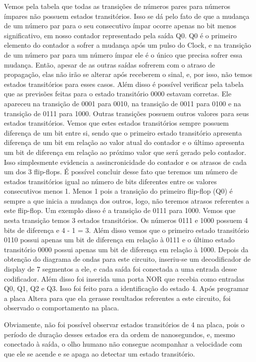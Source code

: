 \documentclass[12pt]{article}
\begin{document}
	
	
	Vemos pela tabela que todas as transições de números pares para números ímpares não possuem estados transitórios. Isso se dá pelo fato de que a mudança de um número par para o seu consecutivo ímpar ocorre apenas no bit menos significativo, em nosso contador representado pela saída Q0. Q0 é o primeiro elemento do contador a sofrer a mudança após um pulso do Clock, e na transição de um número par para um número ímpar ele é o único que precisa sofrer essa mudança. Então, apesar de as outras saídas sofrerem com o atraso de propagação, elas não irão se alterar após receberem o sinal, e, por isso, não temos estados transitórios para esses casos. 
	Além disso é possível verificar pela tabela que as previsões feitas para o estado transitório 0000 estavam corretas. Ele apareceu na transição de 0001 para 0010, na transição de 0011 para 0100 e na transição de 0111 para 1000. 
	Outras transições possuem outros valores para seus estados transitórios. Vemos que estes estados transitórios sempre possuem diferença de um bit entre si, sendo que o primeiro estado transitório apresenta diferença de um bit em relação ao valor atual do contador e o último apresenta um bit de diferença em relação ao próximo valor que será gerado pelo contador. Isso simplesmente evidencia a assincronicidade do contador e os atrasos de cada um dos 3 flip-flops. É possível concluir desse fato que teremos um número de estados transitórios igual ao número de bits diferentes entre os valores consecutivos menos 1. Menos 1 pois a transição do primeiro flip-flop (Q0) é sempre a que inicia a mudança dos outros, logo, não teremos atrasos referentes a este flip-flop. Um exemplo disso é a transição de 0111 para 1000. Vemos que nesta transição temos 3 estados transitórios. Os números 0111 e 1000 possuem 4 bits de diferença e 4 - 1 = 3. Além disso vemos que o primeiro estado transitório 0110 possui apenas um bit de diferença em relação à 0111 e o último estado transitório 0000 possui apenas um bit de diferença em relação à 1000.
	Depois da obtenção do diagrama de ondas para este circuito, inseriu-se um decodificador de display de 7 segmentos a ele, e cada saída foi conectada a uma entrada desse codificador. Além disso foi inserida uma porta NOR que recebia como entradas Q0, Q1, Q2 e Q3. Isso foi feito para a identificação do estado 4.
	Após programar a placa Altera para que ela gerasse resultados referentes a este circuito, foi observado o comportamento na placa. 
	
	
	
	Obviamente, não foi possível observar estados transitórios de 4 na placa, pois o período de duração desses estados era da ordem de nanosegundos, e, mesmo conectado à saída, o olho humano não consegue acompanhar a velocidade com que ele se acende e se apaga ao detectar um estado transitório.
	
\end{document}

